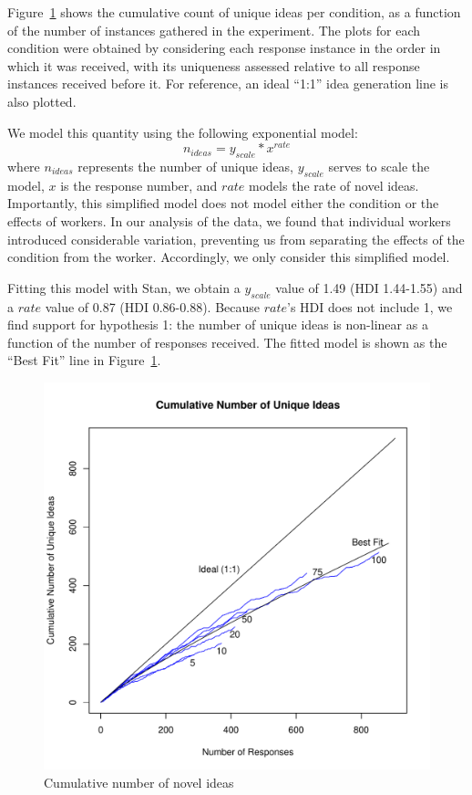 Figure~\ref{fig:cumulative_ideas} shows the cumulative count of unique ideas per condition, as a function of the number of instances gathered in the experiment. The plots for each condition were obtained by considering each response instance in the order in which it was received, with its uniqueness assessed relative to all response instances received before it. For reference, an ideal ``1:1'' idea generation line is also plotted.

We model this quantity using the following exponential model:
\[n_{ideas} = y_{scale} * x^{rate}\]
where $n_{ideas}$ represents the number of unique ideas, $y_{scale}$ serves to scale the model, $x$ is the response number, and $rate$ models the rate of novel ideas. Importantly, this simplified model does not model either the condition or the effects of workers. In our analysis of the data, we found that individual workers introduced considerable variation, preventing us from separating the effects of the condition from the worker. Accordingly, we only consider this simplified model.

Fitting this model with Stan, we obtain a $y_{scale}$ value of 1.49 (HDI 1.44-1.55) and a $rate$ value of 0.87 (HDI 0.86-0.88). Because $rate$'s HDI does not include 1, we find support for hypothesis 1: the number of unique ideas is non-linear as a function of the number of responses received. The fitted model is shown as the ``Best Fit'' line in Figure~\ref{fig:cumulative_ideas}.

\begin{figure}[h!]
    \centering
    \includegraphics[width=0.9\columnwidth]{cumulative_ideas}
    \caption{Cumulative number of novel ideas}
    \label{fig:cumulative_ideas}
\end{figure}

